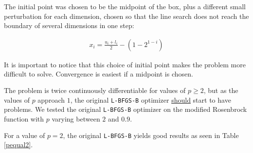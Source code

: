 The initial point was chosen to be the midpoint of the box, plus a different small perturbation for each dimension, chosen so that the line search does not reach the boundary of several dimensions in one step:

\begin{equation}
  \begin{aligned}
    x_i = \frac{u_i + l_i}{2} - \left(1 - 2^{1 - i}\right)
  \end{aligned}
\end{equation}

It is important to notice that this choice of initial point makes the problem more difficult to solve. Convergence is easiest if a midpoint is chosen.

The problem is twice continuously differentiable for values of $p \geq 2$, but as the values of $p$ approach $1$, the original \texttt{L-BFGS-B} optimizer \underline{should} start to have problems. We tested the original \texttt{L-BFGS-B} optimizer on the modified Rosenbrock function with $p$ varying between $2$ and $0.9$. 

For a value of $p = 2$, the original \texttt{L-BFGS-B} yields good results as seen in Table \ref{pequal2}.

